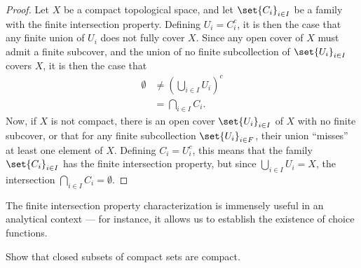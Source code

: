 \documentclass[10pt]{mypackage}
\begin{document}
\begin{proof}
  Let $X$ be a compact topological space, and let $\set{C_i}_{i\in I}$ be a family with the finite intersection property. Defining $U_i = C_i^{c}$, it is then the case that any finite union of $U_i$ does not fully cover $X$. Since any open cover of $X$ must admit a finite subcover, and the union of no finite subcollection of $\set{U_i}_{i\in I}$ covers $X$, it is then the case that
  \begin{align*}
    \emptyset &\neq \left( \bigcup_{i\in I}U_i \right)^{c}\\
              &= \bigcap_{i\in I}C_i.
  \end{align*}
  Now, if $X$ is not compact, there is an open cover $\set{U_i}_{i\in I}$ of $X$ with no finite subcover, or that for any finite subcollection $\set{U_i}_{i\in F}$, their union ``misses'' at least one element of $X$. Defining $C_i = U_i^{c}$, this means that the family $\set{C_i}_{i\in I}$ has the finite intersection property, but since $\bigcup_{i\in I}U_i = X$, the intersection $\bigcap_{i\in I}C_i = \emptyset$.
\end{proof}
The finite intersection property characterization is immensely useful in an analytical context --- for instance, it allows us to establish the existence of choice functions.
\begin{exercise}
  Show that closed subsets of compact sets are compact.
\end{exercise}
\end{document}
